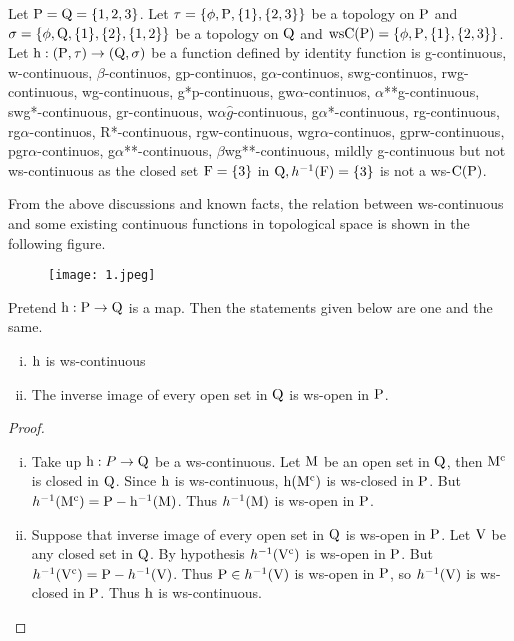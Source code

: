 \begin{exm}\label{exam3.2.7}
Let $\mathrm{P}=\mathrm{Q}= \{1, 2, 3\}$. Let $\tau = \{\phi, \mathrm{P}, \{1\}, \{2,3\}\}$ be a topology on $\mathrm{P}$ and $\sigma =\{\phi, \mathrm{Q}, \{1\},\{2\}, \{1,2\}\}$ be a topology on $\mathrm{Q}$ and $\mathrm{ws}\mathrm{C}(\mathrm{P})=\{\phi, \mathrm{P}, \{1\},\{2,3\}\}$. Let $\mathrm{h}: (\mathrm{P}, \tau )\to (\mathrm{Q}, \sigma)$ be a function defined by identity function is g-continuous, w-continuous, $\beta$-continuos, gp-continuos, g$\alpha$-continuos, swg-continuos, rwg-continuous, wg-continuous, g*p-continuous, gw$\alpha$-continuos, $\alpha${*}{*}g-continuous, swg*-continuous, gr-continuous, w$\alpha\hat{g}$-continuous, g$\alpha$*-continuous, rg-continuous, rg$\alpha$-continuos, R*-continuous, rgw-continuous, wgr$\alpha$-continuos, gprw-continuous, pgr$\alpha$-continuos, g$\alpha${*}{*}-continuous, $\beta$wg{*}{*}-continuous, mildly g-continuous but not ws-continuous as the closed set $\mathrm{F}=\{3\}$ in $\mathrm{Q}, h^{-1} (\mathrm{F})=\{3\}$ is not a ws-$\mathrm{C}(\mathrm{P})$.
\end{exm}

\begin{rem}\label{rem3.2.2} 
From the above discussions and known facts, the relation between ws-continuous and some existing continuous functions in topological space is shown in the following figure.
\begin{figure}[!htb]
\centering
\texttt{[image: 1.jpeg]}
\end{figure}
\end{rem}

\begin{thm}\label{thm3.2.5}
Pretend $\mathrm{h}: \mathrm{P}\to \mathrm{Q}$ is a map. Then the statements given below are one and the same.
\begin{enumerate}[(i)]
\item $\mathrm{h}$ is ws-continuous
\item The inverse image of every open set in $\mathrm{Q}$ is ws-open in $\mathrm{P}$.
\end{enumerate}
\end{thm}

\begin{proof}
\begin{enumerate}[(i)]
\item Take up $\mathrm{h}: P\to \mathrm{Q}$ be a ws-continuous. Let $\mathrm{M}$ be an open set in $\mathrm{Q}$, then $\mathrm{M}^{\text{c}}$ is closed in $\mathrm{Q}$. Since $\mathrm{h}$ is ws-continuous, $\mathrm{h}(\mathrm{M}^{\text{c}})$ is ws-closed in $\mathrm{P}$. But $h^{-1}(\mathrm{M}^{\text{c}})=\mathrm{P}- \mathrm{h}^{-1}(\mathrm{M})$. Thus $h^{-1}(\mathrm{M})$ is ws-open in $\mathrm{P}$.

\item Suppose that inverse image of every open set in $\mathrm{Q}$ is ws-open in $\mathrm{P}$. Let $\mathrm{V}$ be any closed set in $\mathrm{Q}$. By hypothesis $h^{-1} (\mathrm{V}^{\text{c}})$ is ws-open in $\mathrm{P}$. But $h^{-1}(\mathrm{V}^{\text{c}}) = \mathrm{P}-h^{-1}(\mathrm{V})$. Thus $\mathrm{P}\in h^{-1} (\mathrm{V})$ is ws-open in $\mathrm{P}$, so $h^{-1}(\mathrm{V})$ is ws-closed in $\mathrm{P}$. Thus $\mathrm{h}$ is ws-continuous.
\end{enumerate}
\end{proof}


